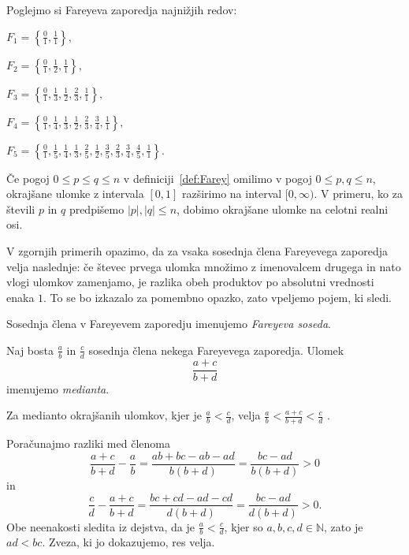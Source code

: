 \documentclass[mat1]{fmfdelo}
\begin{document}
\begin{primer}
Poglejmo si Fareyeva zaporedja najnižjih redov:

\(F_1 = \left \{\frac{0}{1}, \frac{1}{1} \right \}, \)

\(F_2 = \left \{\frac{0}{1}, \frac{1}{2}, \frac{1}{1} \right \}, \)

\(F_3 = \left \{\frac{0}{1}, \frac{1}{3}, \frac{1}{2}, \frac{2}{3}, \frac{1}{1} \right \}, \)

\(F_4 = \left \{\frac{0}{1}, \frac{1}{4}, \frac{1}{3}, \frac{1}{2}, \frac{2}{3}, \frac{3}{4}, \frac{1}{1} \right \}, \)

\(F_5 = \left \{\frac{0}{1}, \frac{1}{5}, \frac{1}{4}, \frac{1}{3}, \frac{2}{5}, \frac{1}{2}, \frac{3}{5}, \frac{2}{3}, \frac{3}{4}, \frac{4}{5}, \frac{1}{1}\right \}. \)
\end{primer}

\begin{opomba}
Če pogoj $0 \leq p \leq q \leq n$ v definiciji~\ref{def:Farey} omilimo v pogoj $0 \leq p,q \leq n$, okrajšane ulomke z intervala $[0,1]$ razširimo na interval $[0, \infty)$. 
V primeru, ko za števili $p$ in $q$ predpišemo $|p|, |q| \leq n$, dobimo okrajšane ulomke na celotni realni osi.
\end{opomba}

V zgornjih primerih opazimo, da za vsaka sosednja člena Fareyevega zaporedja velja naslednje: če števec prvega ulomka množimo z imenovalcem drugega in nato vlogi ulomkov zamenjamo, je razlika obeh produktov po absolutni vrednosti enaka $1$. To se bo izkazalo za pomembno opazko, zato vpeljemo pojem, ki sledi.

\begin{definicija}
Sosednja člena v Fareyevem zaporedju imenujemo \emph{Fareyeva soseda}.
\end{definicija}

%
\begin{definicija}
Naj bosta $\frac{a}{b}$ in $\frac{c}{d}$ sosednja člena nekega Fareyevega zaporedja. Ulomek \[\frac{a+c}{b+d} \] imenujemo \emph{medianta}.
\end{definicija}

\begin{trditev}
\label{Trd:MedOcena}
Za medianto okrajšanih ulomkov, kjer je \(\frac{a}{b} < \frac{c}{d}\), velja  \(\frac{a}{b} < \frac{a+c}{b+d} < \frac{c}{d}\) .
\end{trditev}

\begin{dokaz}
Poračunajmo razliki med členoma
\[\frac{a+c}{b+d} - \frac{a}{b} = \frac{ab+bc-ab-ad}{b(b+d)} = \frac{bc-ad}{b(b+d)} > 0\] in
\[\frac{c}{d} - \frac{a+c}{b+d} = \frac{bc+cd-ad-cd}{d(b+d)} = \frac{bc-ad}{d(b+d)} > 0.\]
Obe neenakosti sledita iz dejstva, da je \(\frac{a}{b} < \frac{c}{d}\), kjer so \(a, b, c, d \in \mathbb{N} \), zato je \( ad < bc.\)
Zveza, ki jo dokazujemo, res velja. 
\end{dokaz}
\end{document}
